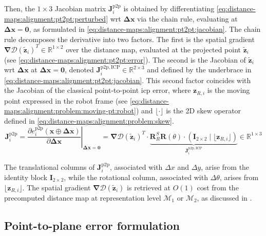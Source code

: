 Then, the $1 \times 3$ Jacobian matrix $\mathbf{J}_i^{\mathrm{p2p}}$ is obtained
by differentiating \eqref{eq:distance-maps:alignment:pt2pt:perturbed} \gls{wrt}
$\mathbf{\Delta x}$ via the chain rule, evaluating at
$\mathbf{\Delta x} = \mathbf{0}$, as formulated in
\eqref{eq:distance-maps:alignment:pt2pt:jacobian}.
The chain rule decomposes the derivative into two factors.
The first is the spatial gradient
$\bm{\nabla}\mathcal{D}\!\left(\tilde{\mathbf{z}}_i\right)^T \in
\mathbb{R}^{1 \times 2}$ over the distance map, evaluated at the projected point
$\tilde{\mathbf{z}}_i$ (see \eqref{eq:distance-maps:alignment:pt2pt:error}).
The second is the Jacobian of $\tilde{\mathbf{z}}_i$ \gls{wrt}
$\mathbf{\Delta x}$ at $\mathbf{\Delta x} = \mathbf{0}$, denoted
$\mathbf{J}_i^{\mathrm{p2p},\mathrm{ICP}} \in \mathbb{R}^{2 \times 3}$
and defined by the underbrace in
\eqref{eq:distance-maps:alignment:pt2pt:jacobian}.
This second factor coincides with the Jacobian of the classical
point-to-point \gls{icp} error, where
$\mathbf{z}_{R,i}$ is the moving point
expressed in the robot frame (see
\eqref{eq:distance-maps:alignment:problem:moving-pt:robot})
and $\lfloor\cdot\rfloor$ is the 2D skew operator
defined in \eqref{eq:distance-maps:alignment:problem:skew}.
\begin{equation}
\label{eq:distance-maps:alignment:pt2pt:jacobian}
\mathbf{J}_i^{\mathrm{p2p}} =
\left.\frac{\partial e_i^{\mathrm{p2p}}\!\left(\mathbf{x} \oplus \mathbf{\Delta x}\right)}
           {\partial \mathbf{\Delta x}}\right|_{\mathbf{\Delta x}=\mathbf{0}}
= \bm{\nabla}\mathcal{D}\!\left(\tilde{\mathbf{z}}_i\right)^T \cdot
  \underbrace{
    \mathbf{R}_R^S \mathbf{R}(\theta)
    \cdot \left(\mathbf{I}_{2\times2} \mid \lfloor\mathbf{z}_{R,i}\rfloor\right)
  }_{\mathbf{J}_i^{\mathrm{p2p},\mathrm{ICP}}}
\in \mathbb{R}^{1\times3}
\end{equation}

The translational columns of $\mathbf{J}_i^{\mathrm{p2p}}$, associated with
$\Delta x$ and $\Delta y$, arise from the identity block $\mathbf{I}_{2\times2}$,
while the rotational column, associated with $\Delta\theta$, arises from
$\lfloor\mathbf{z}_{R,i}\rfloor$.
The spatial gradient $\bm{\nabla}\mathcal{D}\!\left(\tilde{\mathbf{z}}_i\right)$
is retrieved at $O(1)$ cost from the precomputed distance map at representation
level $\mathcal{M}_1$ or $\mathcal{M}_2$, as discussed in
.

\subsection{Point-to-plane error formulation}
\label{sec:distance-maps:alignment:pt2pl}

